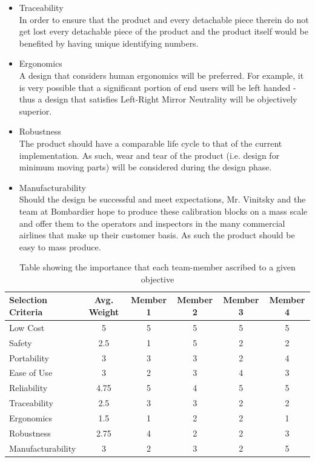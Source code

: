 \documentclass[12pt]{article}
\begin{document}
\begin{itemize}
\item Traceability \hfill \\
In order to ensure that the product and every detachable piece therein do not get lost every detachable piece of the product and the product itself would be benefited by having unique identifying numbers. 

\item Ergonomics \hfill \\
A design that considers human ergonomics will be preferred. For example, it is very possible that  a significant portion of end users will be left handed - thus a design that satisfies Left-Right Mirror Neutrality will be objectively superior.

\item Robustness \hfill \\
The product should have a comparable life cycle to that of the current implementation. As such, wear and tear of the product (i.e. design for minimum moving parts) will be considered during the design phase.

\item Manufacturability \hfill \\
Should the design be successful and meet expectations, Mr. Vinitsky and the team at Bombardier hope to produce these calibration blocks on a mass scale and offer them to the operators and inspectors in the many commercial airlines that make up their customer basis. As such the product should be easy to mass produce. 
\end{itemize}


\begin{table}[h!]   
\begin{center}
    \begin{tabular}{ | l | c | c | c | c | c |}
    \hline
    Selection Criteria & Avg. Weight & Member 1 & Member 2 & Member 3 & Member 4 \\ \hline
    Low Cost & 5 & 5 & 5 & 5 & 5  \\ \hline
    Safety & 2.5 & 1 & 5 & 2 & 2  \\ \hline
    Portability & 3 & 3 & 3 & 2 & 4  \\ \hline
    Ease of Use & 3 & 2 & 3 & 4 & 3  \\ \hline
    Reliability & 4.75 & 5 & 4 & 5 & 5  \\ \hline
    Traceability & 2.5 & 3 & 3 & 2 & 2  \\ \hline
    Ergonomics & 1.5 & 1 & 2 & 2 & 1  \\ \hline
    Robustness & 2.75 & 4 & 2 & 2 & 3  \\ \hline
    Manufacturability & 3 & 2 & 3 & 2 & 5  \\ \hline
	\end{tabular}
\caption{Table showing the importance that each team-member ascribed to a given objective}    
\end{center}
\end{table}
\end{document}
